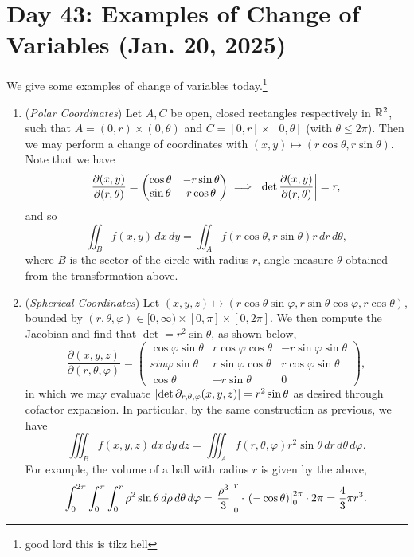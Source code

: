 \section{Day 43: Examples of Change of Variables (Jan. 20, 2025)}
We give some examples of change of variables today.\footnote{good lord this is tikz hell}
\begin{enumerate}[label=(\alph*)]
    \item (\textit{Polar Coordinates}) Let $A, C$ be open, closed rectangles respectively in $\mathbb R^2$, such that $A = (0, r) \times (0, \theta)$ and $C = [0, r] \times [0, \theta]$ (with $\theta \leq 2\pi$). Then we may perform a change of coordinates with $(x, y) \mapsto (r \cos \theta, r \sin \theta)$. Note that we have
    \[ \frac{\partial(x, y)}{\partial(r, \theta)} = \begin{pmatrix} \cos \theta & - r \sin \theta \\ \sin \theta & r \cos \theta \end{pmatrix} \implies \left\lvert \det \frac{\partial(x, y)}{\partial(r, \theta)} \right\rvert = r, \]
    and so
    \[ \iint_B f(x, y) \, dx \, dy = \iint_A f(r \cos \theta, r \sin \theta) r \, dr \, d\theta, \]
    where $B$ is the sector of the circle with radius $r$, angle measure $\theta$ obtained from the transformation above.
    \item (\textit{Spherical Coordinates}) Let $(x, y, z) \mapsto (r \cos \theta \sin \varphi, r \sin \theta \cos \varphi, r \cos \theta)$, bounded by $(r, \theta, \varphi) \in [0, \infty) \times [0, \pi] \times [0, 2\pi]$. We then compute the Jacobian and find that $\det = r^2 \sin \theta$, as shown below,
    \[ \frac{\partial(x, y, z)}{\partial(r, \theta, \varphi)} = \begin{pmatrix} \cos \varphi \sin \theta & r \cos \varphi \cos \theta & - r \sin \varphi \sin \theta \\ sin \varphi \sin \theta & r \sin \varphi \cos \theta & r \cos \varphi \sin \theta \\ \cos \theta & - r \sin \theta & 0 \end{pmatrix}, \]
    in which we may evaluate $\left\lvert \det \partial_{r, \theta, \varphi}(x, y, z) \right\rvert = r^2 \sin \theta$ as desired through cofactor expansion. In particular, by the same construction as previous, we have
    \[ \iiint_B f(x, y, z) \, dx \, dy \, dz = \iiint_A f(r, \theta, \varphi) r^2 \sin \theta \, dr \, d\theta \, d\varphi. \]
    For example, the volume of a ball with radius $r$ is given by the above,
    \[ \int_0^{2\pi} \int_0^\pi \int_0^r \rho^2 \sin \theta \, d\rho \, d\theta \, d\varphi = \left.\frac{\rho^3}{3}\right\rvert_{0}^{r} \cdot \left.(-\cos \theta)\right\rvert_{0}^{2\pi} \cdot 2\pi = \frac{4}{3} \pi r^3. \]

\end{enumerate}
